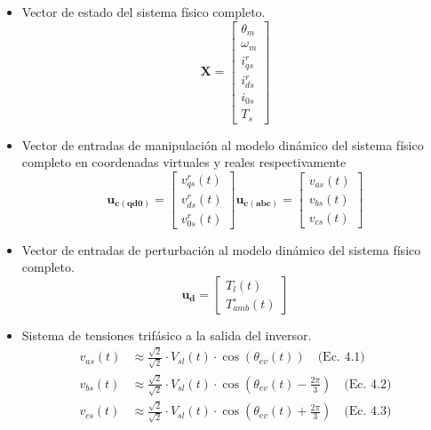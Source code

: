 \documentclass[a4paper, 10pt, onecolumn,journal]{ieeeconf}
\begin{document}
\begin{itemize}
    \item Vector de estado del sistema físico completo.
    \begin{equation}
        \mathbf{X} = \begin{bmatrix} \theta_m \\ \omega_m \\ i^r_{qs} \\ i^r_{ds} \\ i_{0s} \\ T_s \end{bmatrix}
        \label{vector de estado del sistema}
    \end{equation}
    \item Vector de entradas de manipulación al modelo dinámico del sistema físico completo en coordenadas virtuales y reales respectivamente
    \begin{equation}
        \mathbf{u_{c(qd0)}} = \begin{bmatrix} v^r_{qs}(t) \\ v^r_{ds}(t) \\ v^r_{0s}(t)\end{bmatrix}
        \mathbf{u_{c(abc)}} = \begin{bmatrix} v_{as}(t) \\ v_{bs}(t) \\ v_{cs}(t)\end{bmatrix}
        \label{vector de entradas de control}
    \end{equation}
    \item Vector de entradas de perturbación al modelo dinámico del sistema físico completo.
    \begin{equation}
        \mathbf{u_{d}} = \begin{bmatrix} T_l(t) \\ T_{amb}^{\circ}(t)\end{bmatrix}
        \label{vector de entradas de perturbacion}
    \end{equation}
    \item Sistema de tensiones trifásico a la salida del inversor.
    \begin{align}
        v_{as}(t) &\approx \frac{\sqrt{2}}{\sqrt{2}} \cdot V_{sl}(t) \cdot \cos(\theta_{ev}(t)) \quad \text{(Ec. 4.1)} \\
        v_{bs}(t) &\approx \frac{\sqrt{2}}{\sqrt{2}} \cdot V_{sl}(t) \cdot \cos\left(\theta_{ev}(t) - \frac{2\pi}{3}\right) \quad \text{(Ec. 4.2)} \\
        v_{cs}(t) &\approx \frac{\sqrt{2}}{\sqrt{2}} \cdot V_{sl}(t)\cdot \cos\left(\theta_{ev}(t) + \frac{2\pi}{3}\right) \quad \text{(Ec. 4.3)} \\

\end{align}
\end{itemize}
\end{document}

